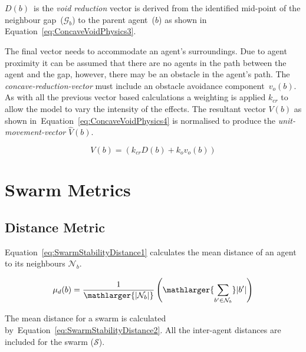 \documentclass[preprint,12pt]{elsarticle}
\newcommand{\card}[1]{\vert{#1}\vert}
\newcommand{\magn}[1]{\vert{#1}\vert}
\begin{document}
$D(b)$~is the \textit{void reduction} vector is derived from the identified
mid-point of the neighbour gap~($\mathcal{G}_b$) to the parent agent~($b$) as
shown in Equation~\ref{eq:ConcaveVoidPhysics3}.

The final vector needs to accommodate an agent's surroundings. Due to agent
proximity it can be assumed that there are no agents in the path between the
agent and the gap, however, there may be an obstacle in the agent's path. The
\textit{concave-reduction-vector} must include an obstacle avoidance
component~$v_o(b)$.  As with all the previous vector based calculations a 
weighting is applied $k_{cr}$ to allow the model to vary the intensity of the effects.  
The resultant vector $V(b)$ as shown
in~Equation~\ref{eq:ConcaveVoidPhysics4}  is normalised to produce the \textit{unit-movement-vector}
$\hat V(b)$.

\begin{equation}\label{eq:ConcaveVoidPhysics4}
V(b) = (k_{cr}D(b) + k_ov_o(b))
\end{equation}

\section{Swarm Metrics}

\subsection{Distance Metric}

Equation~\ref{eq:SwarmStabilityDistance1} calculates the mean distance of an
agent to its neighbours $\mathcal{N}_b$. 

\begin{equation}
\label{eq:SwarmStabilityDistance1}
\mu_d(b) =
\frac{1}{\mathlarger{\card{\mathcal{N}_b}}}\left({\mathlarger{\sum_{b' \in
\mathcal{N}_b}}\magn{b'}}\right)
\end{equation}

The mean distance for a swarm is calculated
by~Equation~\ref{eq:SwarmStabilityDistance2}. All the inter-agent distances
are included for the swarm ($\mathcal S$). 
\end{document}
